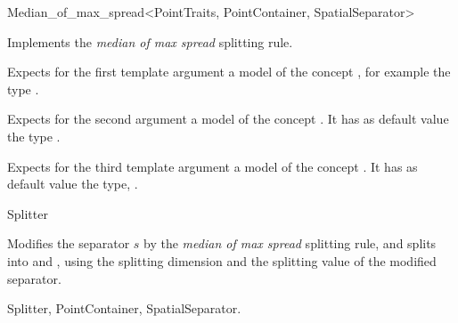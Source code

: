 

\begin{ccRefFunctionObjectClass}{Median_of_max_spread<PointTraits, PointContainer, SpatialSeparator>}

\ccDefinition
Implements the {\em median of max spread} splitting rule.


\ccParameters

Expects for the first template argument a model of
the concept , for example
the type . 

Expects for the second argument a model of the concept . It has as default value
the type .

Expects for the third template argument a model of the concept . It has as default value
the type, .



\ccIsModel

Splitter

\ccTypes



\ccOperations

{Modifies the separator $s$ by the {\em median of max spread} splitting rule, 
and splits  into  and ,
using the splitting dimension and the splitting value of the modified separator.
}

\ccSeeAlso

Splitter, PointContainer, SpatialSeparator.


\end{ccRefFunctionObjectClass}


